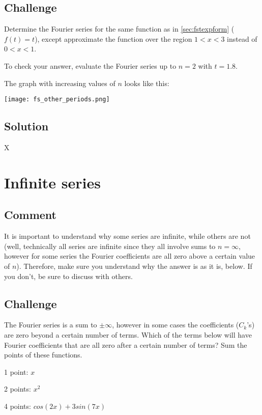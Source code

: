 \subsection*{Challenge}
Determine the Fourier series for the same function as in \ref{sec:fstexpform} ($f(t)=t$), except approximate the function over the region $1<x<3$ instead of $0<x<1$.

To check your answer, evaluate the Fourier series up to $n=2$ with $t=1.8$.

The graph with increasing values of $n$ looks like this:

\texttt{[image: fs\_other\_periods.png]}

\subsection*{Solution}
X





\newpage
\section{Infinite series}

\subsection*{Comment}
It is important to understand why some series are infinite, while others are not (well, technically all series are infinite since they all involve sums to $n=\infty$, however for some series the Fourier coefficients are all zero above a certain value of $n$). Therefore, make sure you understand why the answer is as it is, below. If you don't, be sure to discuss with others.

\subsection*{Challenge}
The Fourier series is a sum to $\pm \infty$, however in some cases the coefficients ($C_k$'s) are zero beyond a certain number of terms. Which of the terms below will have Fourier coefficients that are all zero after a certain number of terms? Sum the points of these functions.

1 point: $x$

2 points: $x^2$

4 points: $cos(2 x) + 3 sin(7 x)$

